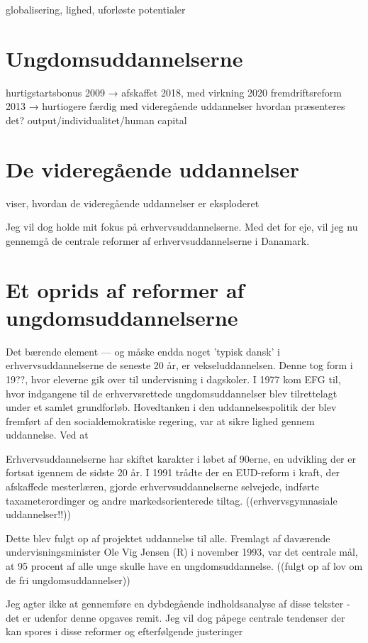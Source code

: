 globalisering, lighed, uforløste potentialer

\section{Ungdomsuddannelserne}

hurtigstartsbonus 2009 → afskaffet 2018, med virkning 2020
fremdriftsreform 2013 → hurtiogere færdig med videregående uddannelser
hvordan præsenteres det? output/individualitet/human capital
\section{De videregående uddannelser}
\autocite{schoferWorldwideExpansionHigher2005} viser, hvordan de videregående uddannelser er eksploderet 

Jeg vil dog holde mit fokus på erhvervsuddannelserne.
Med det for eje, vil jeg nu gennemgå de centrale reformer af erhvervsuddannelserne i Danamark.
\section{Et oprids af reformer af ungdomsuddannelserne}
Det bærende element --- og måske endda noget 'typisk dansk' i erhvervsuddannelserne de seneste 20 år, er vekseluddannelsen.
Denne tog form i 19??, hvor eleverne gik over til undervisning i dagskoler.
I 1977 kom EFG til, hvor indgangene til de erhvervsrettede ungdomsuddannelser blev tilrettelagt under et samlet grundforløb.
Hovedtanken i den uddannelsespolitik der blev fremført af den socialdemokratiske regering, var at sikre lighed gennem uddannelse.
Ved at 

Erhvervsuddannelserne har skiftet karakter i løbet af 90erne, en udvikling der er fortsat igennem de sidste 20 år.
I 1991 trådte der en EUD-reform i kraft, der afskaffede mesterlæren, gjorde erhvervsuddannelserne selvejede, indførte taxameterordinger og andre markedsorienterede tiltag.
((erhvervsgymnasiale uddannelser!!))


Dette blev fulgt op af projektet uddannelse til alle.
Fremlagt af daværende undervisningsminister Ole Vig Jensen (R) i november 1993, var det centrale mål, at 95 procent af alle unge skulle have en ungdomsuddannelse.
((fulgt op af lov om de fri ungdomsuddannelser))

Jeg agter ikke at gennemføre en dybdegående indholdsanalyse af disse tekster - det er udenfor denne opgaves remit.
Jeg vil dog påpege centrale tendenser der kan spores i disse reformer og efterfølgende justeringer
